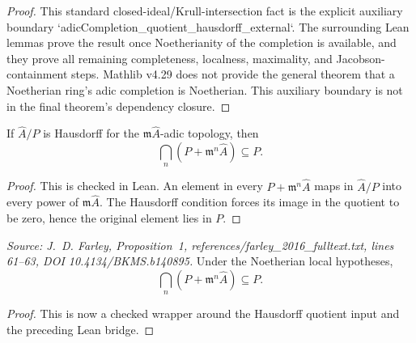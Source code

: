 \begin{proof}
  This standard closed-ideal/Krull-intersection fact is the explicit auxiliary
  boundary `adicCompletion_quotient_hausdorff_external`.  The surrounding Lean
  lemmas prove the result once Noetherianity of the completion is available,
  and they prove all remaining completeness, localness, maximality, and
  Jacobson-containment steps.  Mathlib v4.29 does not provide the general
  theorem that a Noetherian ring's adic completion is Noetherian.  This
  auxiliary boundary is not in the final theorem's dependency closure.
\end{proof}

\begin{lemma}
  \label{lem:adic_completion_neighborhood_iinf_le_prime_of_hausdorff}
  If \(\widehat A/P\) is Hausdorff for the \(\mathfrak m\widehat A\)-adic
  topology, then
  \[
    \bigcap_n(P+\mathfrak m^n\widehat A)\subseteq P.
  \]
\end{lemma}

\begin{proof}
  This is checked in Lean.  An element in every \(P+\mathfrak m^n\widehat A\)
  maps in \(\widehat A/P\) into every power of \(\mathfrak m\widehat A\).  The
  Hausdorff condition forces its image in the quotient to be zero, hence the
  original element lies in \(P\).
\end{proof}

\begin{lemma}
  \label{lem:adic_completion_neighborhood_iinf_le_prime}
  \textit{Source: J.~D. Farley, Proposition~1,
  references/farley\_2016\_fulltext.txt, lines 61--63,
  DOI 10.4134/BKMS.b140895.}
  Under the Noetherian local hypotheses,
  \[
    \bigcap_n(P+\mathfrak m^n\widehat A)\subseteq P.
  \]
\end{lemma}

\begin{proof}
  This is now a checked wrapper around the Hausdorff quotient input and the
  preceding Lean bridge.
\end{proof}

